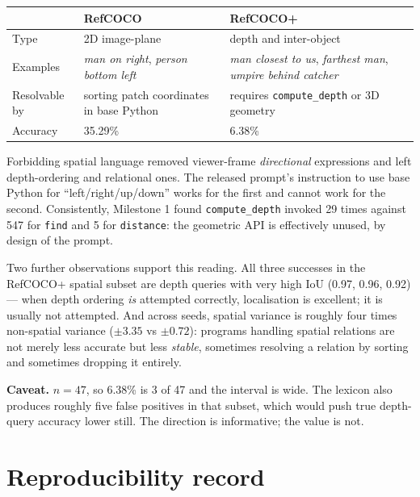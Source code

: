 \documentclass[11pt,a4paper]{article}
\begin{document}
\begin{center}\small
\begin{tabular}{@{}p{}p{}p{}@{}}
\toprule
 & \textbf{RefCOCO} & \textbf{RefCOCO+} \\
\midrule
Type & 2D image-plane & depth and inter-object \\
Examples & \emph{man on right}, \emph{person bottom left} & \emph{man closest to us},
\emph{farthest man}, \emph{umpire behind catcher} \\
Resolvable by & sorting patch coordinates in base Python & requires
\texttt{compute\_depth} or 3D geometry \\
Accuracy & 35.29\% & 6.38\% \\
\bottomrule
\end{tabular}
\end{center}

\vspace{4pt}
Forbidding spatial language removed viewer-frame \emph{directional} expressions and
left depth-ordering and relational ones. The released prompt's instruction to use
base Python for ``left/right/up/down'' works for the first and cannot work for the
second. Consistently, Milestone 1 found \texttt{compute\_depth} invoked 29 times
against 547 for \texttt{find} and 5 for \texttt{distance}: the geometric API is
effectively unused, by design of the prompt.

Two further observations support this reading. All three successes in the RefCOCO+
spatial subset are depth queries with very high IoU (0.97, 0.96, 0.92) --- when depth
ordering \emph{is} attempted correctly, localisation is excellent; it is usually not
attempted. And across seeds, spatial variance is roughly four times non-spatial
variance ($\pm3.35$ vs $\pm0.72$): programs handling spatial relations are not merely
less accurate but less \emph{stable}, sometimes resolving a relation by sorting and
sometimes dropping it entirely.

\textbf{Caveat.} $n{=}47$, so 6.38\% is 3 of 47 and the interval is wide. The lexicon
also produces roughly five false positives in that subset, which would push true
depth-query accuracy lower still. The direction is informative; the value is not.

\section{Reproducibility record}
\end{document}
